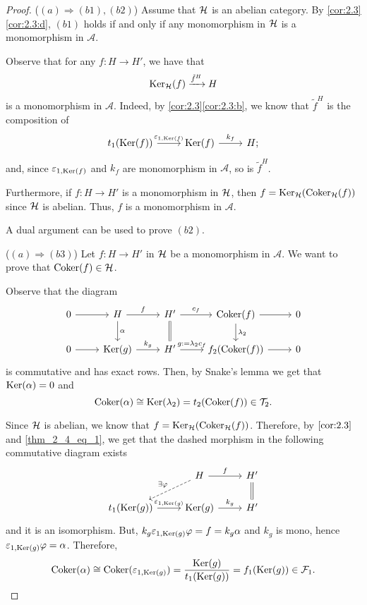 \begin{proof}
  ($(a)\Rightarrow (b1),(b2)$) Assume that $\mathcal{H}$ is an abelian category. By \ref{cor:2.3}\ref{cor:2.3:d}, $(b1)$ holds if and only if any monomorphism in $\mathcal{H}$ is a monomorphism in $\mathscr{A}$.

  Observe that for any $f:H\to H'$, we have that \[\operatorname{Ker}_{\mathcal{H}}(f)\xrightarrow{\tilde{f}^H}H\] is a monomorphism in $\mathscr{A}$. Indeed, by \ref{cor:2.3}\ref{cor:2.3:b}, we know that $\tilde{f}^H$ is the composition of
  \begin{equation*}
    \begin{tikzcd}
      t_1(\Ker(f))\arrow{r}{\varepsilon_{1,\Ker(f)}}
        & \Ker(f)\arrow{r}{k_f}
          & H;
    \end{tikzcd}
  \end{equation*}
  and, since $\varepsilon_{1,\operatorname{Ker}(f)}$ and $k_f$ are monomorphism in $\mathscr{A}$, so is $\tilde{f}^H$.

  Furthermore, if $f:H\to H'$ is a monomorphism in $\mathcal{H}$, then $f=\operatorname{Ker}_{\mathcal{H}}(\operatorname{Coker}_{\mathcal{H}}(f))$ since $\mathcal{H}$ is abelian. Thus, $f$ is a monomorphism in $\mathscr{A}$.

  A dual argument can be used to prove $(b2)$.

  ($(a)\Rightarrow (b3)$) Let $f:H\to H'$ in $\mathcal{H}$ be a monomorphism in $\mathscr{A}$. We want to prove that $\operatorname{Coker}(f)\in\mathcal{H}$.

  Observe that the diagram
  \begin{equation}\label{thm_2_4_eq_1}
    \begin{tikzcd}
      0\arrow{r}
      & H\arrow{r}{f}\arrow{d}{\alpha}
        & H'\arrow{r}{c_f}\arrow[equal]{d}
          & \Coker(f)\arrow{d}{\lambda_2}\arrow{r}
            & 0\\
      0 \arrow{r}
      & \Ker(g)\arrow{r}{k_g}
        & H' \arrow{r}{g:=\lambda_2c_f}
          & f_2(\Coker(f)) \arrow{r}
            & 0
    \end{tikzcd}
  \end{equation}
  is commutative and has exact rows. Then, by Snake's lemma we get that $\operatorname{Ker}(\alpha)=0$ and \[\operatorname{Coker}(\alpha)\cong\operatorname{Ker}(\lambda_2)=t_2(\operatorname{Coker}(f))\in\mathcal{T}_2.\]

  Since $\mathcal{H}$ is abelian, we know that $f=\operatorname{Ker}_{\mathcal{H}}(\operatorname{Coker}_{\mathcal{H}}(f))$. Therefore, by $\ref{cor:2.3}$ and \eqref{thm_2_4_eq_1}, we get that the dashed morphism
  in the following commutative diagram exists
  \begin{equation*}
    \begin{tikzcd}
      & H\arrow{r}{f}\arrow[dashed]{dl}[']{\exists\varphi}
        & H'\arrow[equal]{d}\\
      t_1(\Ker(g))\arrow{r}{\varepsilon_{1,\Ker(g)}}
      & \Ker(g)\arrow{r}{k_g}
        & H'
    \end{tikzcd}
  \end{equation*}
  and it is an isomorphism. But, $k_g\varepsilon_{1,\operatorname{Ker}(g)}\varphi = f= k_g\alpha$ and $k_g$ is mono, hence $\varepsilon_{1,\operatorname{Ker}(g)}\varphi = \alpha$. Therefore,
  \begin{equation*}
    \operatorname{Coker}(\alpha)\cong \operatorname{Coker}(\varepsilon_{1,\operatorname{Ker}(g)})=\frac{\operatorname{Ker}(g)}{t_1(\operatorname{Ker}(g))}= f_1(\operatorname{Ker}(g))\in\mathcal{F}_1.
  \end{equation*}


\end{proof}
